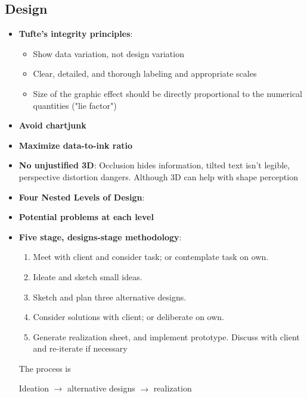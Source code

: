 \documentclass{report}
\begin{document}
    \subsection{Design}
    \begin{itemize}
        \item \textbf{Tufte's integrity principles}: 
            \begin{itemize}
                \item Show data variation, not design variation
                \item Clear, detailed, and thorough labeling and appropriate scales
                \item Size of the graphic effect should be directly proportional to the numerical quantities ("lie factor")
            \end{itemize}
        \item \textbf{Avoid chartjunk}
        \item \textbf{Maximize data-to-ink ratio}
        \item \textbf{No unjustified 3D}: Occlusion hides information, tilted text isn't legible, perspective distortion dangers. Although 3D can help with shape perception
        \item \textbf{Four Nested Levels of Design}: 
            \bigbreak \noindent 
        \item \textbf{Potential problems at each level}
            \bigbreak \noindent 
        \item \textbf{Five stage, designs-stage methodology}: 
            \begin{enumerate}
                \item Meet with client and consider task; or contemplate task on own.
                \item Ideate and sketch small ideas.
                \item Sketch and plan three alternative designs.
                \item Consider solutions with client; or deliberate on own.
                \item Generate realization sheet, and implement prototype. Discuss with client and re-iterate if necessary
            \end{enumerate}
            The process is 
            \begin{center}
                Ideation $\to$ alternative designs $\to$ realization
            \end{center}
            \bigbreak \noindent 
    \end{itemize}
\end{document}
